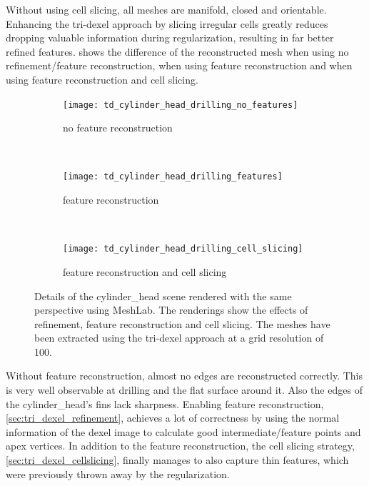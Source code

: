 Without using cell slicing, all meshes are manifold, closed and orientable.
Enhancing the tri-dexel approach by slicing irregular cells greatly reduces dropping valuable information during regularization, resulting in far better refined features.
 shows the difference of the reconstructed mesh when using no refinement/feature reconstruction, when using feature reconstruction and when using feature reconstruction and cell slicing.
%
\begin{figure}
	\centering
	\begin{subfigure}[b]{0.67\textwidth}
		\centering
		\texttt{[image: td\_cylinder\_head\_drilling\_no\_features]}
		\caption{no feature reconstruction}
		\label{fig:td_cylinder_head_drilling_no_features}
	\end{subfigure}
	\bigskip\\
	\begin{subfigure}[b]{0.67\textwidth}
		\centering
		\texttt{[image: td\_cylinder\_head\_drilling\_features]}
		\caption{feature reconstruction}
		\label{fig:td_cylinder_head_drilling_features}
	\end{subfigure}
	\bigskip\\
	\begin{subfigure}[b]{0.67\textwidth}
		\centering
		\texttt{[image: td\_cylinder\_head\_drilling\_cell\_slicing]}
		\caption{feature reconstruction and cell slicing}
		\label{fig:td_cylinder_head_drilling_cell_slicing}
	\end{subfigure}
	\caption{
		Details of the cylinder\_head scene rendered with the same perspective using MeshLab.
		The renderings show the effects of refinement, feature reconstruction and cell slicing.
		The meshes have been extracted using the tri-dexel approach at a grid resolution of 100.
	}
	\label{fig:td_features_and_cell_slicing}
\end{figure}
%
Without feature reconstruction, almost no edges are reconstructed correctly.
This is very well observable at drilling and the flat surface around it.
Also the edges of the cylinder\_head's fins lack sharpness.
Enabling feature reconstruction, \cf \cref{sec:tri_dexel_refinement}, achieves a lot of correctness by using the normal information of the dexel image to calculate good intermediate/feature points and apex vertices.
In addition to the feature reconstruction, the cell slicing strategy, \cf \cref{sec:tri_dexel_cellslicing}, finally manages to also capture thin features, which were previously thrown away by the regularization.

